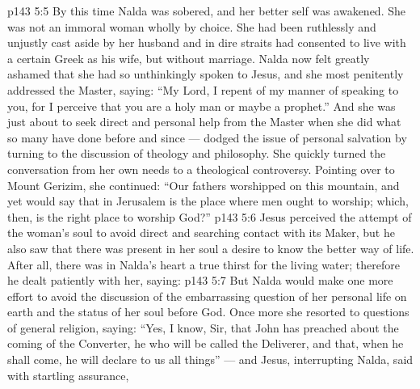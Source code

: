 \vs p143 5:5 By this time Nalda was sobered, and her better self was awakened. She was not an immoral woman wholly by choice. She had been ruthlessly and unjustly cast aside by her husband and in dire straits had consented to live with a certain Greek as his wife, but without marriage. Nalda now felt greatly ashamed that she had so unthinkingly spoken to Jesus, and she most penitently addressed the Master, saying: “My Lord, I repent of my manner of speaking to you, for I perceive that you are a holy man or maybe a prophet.” And she was just about to seek direct and personal help from the Master when she did what so many have done before and since --- dodged the issue of personal salvation by turning to the discussion of theology and philosophy. She quickly turned the conversation from her own needs to a theological controversy. Pointing over to Mount Gerizim, she continued: “Our fathers worshipped on this mountain, and yet  would say that in Jerusalem is the place where men ought to worship; which, then, is the right place to worship God?”
\vs p143 5:6 Jesus perceived the attempt of the woman’s soul to avoid direct and searching contact with its Maker, but he also saw that there was present in her soul a desire to know the better way of life. After all, there was in Nalda’s heart a true thirst for the living water; therefore he dealt patiently with her, saying: 
\vs p143 5:7 But Nalda would make one more effort to avoid the discussion of the embarrassing question of her personal life on earth and the status of her soul before God. Once more she resorted to questions of general religion, saying: “Yes, I know, Sir, that John has preached about the coming of the Converter, he who will be called the Deliverer, and that, when he shall come, he will declare to us all things” --- and Jesus, interrupting Nalda, said with startling assurance, 
